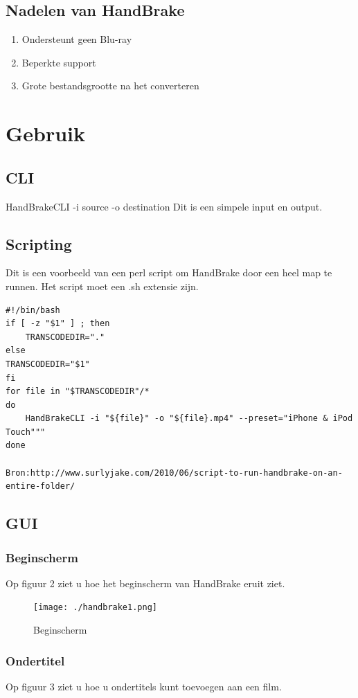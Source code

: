 \documentclass[12pt,a4paper]{article}
\begin{document}
\begin{titlepage}
\begin{center}
\subsection{Nadelen van HandBrake}
\begin{enumerate}
\item Ondersteunt geen Blu-ray 
\item Beperkte support
\item Grote bestandsgrootte na het converteren 

\end{enumerate}
\pagebreak
\section{Gebruik}
\subsection{CLI}
HandBrakeCLI -i source -o destination
Dit is een simpele input en output.
\subsection{Scripting}
Dit is een voorbeeld van een perl script om HandBrake door een heel map te runnen.
Het script moet een .sh extensie zijn.
\begin{verbatim}
#!/bin/bash
if [ -z "$1" ] ; then
	TRANSCODEDIR="."
else
TRANSCODEDIR="$1"
fi
for file in "$TRANSCODEDIR"/*
do
	HandBrakeCLI -i "${file}" -o "${file}.mp4" --preset="iPhone & iPod Touch"""
done

Bron:http://www.surlyjake.com/2010/06/script-to-run-handbrake-on-an-entire-folder/
\end{verbatim}
\pagebreak
\subsection{GUI}
\subsubsection{Beginscherm}
Op figuur 2
 ziet u hoe het beginscherm van HandBrake eruit ziet.
\begin{figure}[h]
\begin{center}

\texttt{[image: ./handbrake1.png]}
\caption{\label{fig2}Beginscherm}
\end{center}
\end{figure}

\subsubsection{Ondertitel}
Op figuur 3 ziet u hoe u ondertitels kunt toevoegen aan een film.


\end{center}
\end{titlepage}
\end{document}
